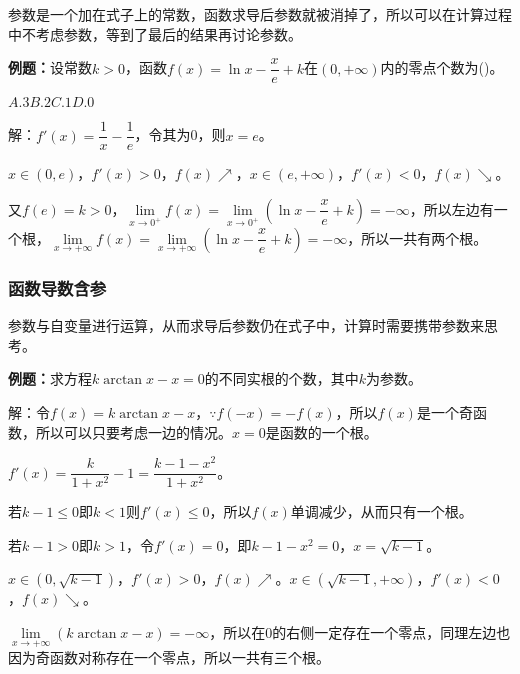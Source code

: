 \documentclass[UTF8, 12pt]{ctexart}
\begin{document}
参数是一个加在式子上的常数，函数求导后参数就被消掉了，所以可以在计算过程中不考虑参数，等到了最后的结果再讨论参数。

\textbf{例题：}设常数$k>0$，函数$f(x)=\ln x-\dfrac{x}{e}+k$在$(0,+\infty)$内的零点个数为()。

$A.3$\qquad$B.2$\qquad$C.1$\qquad$D.0$

解：$f'(x)=\dfrac{1}{x}-\dfrac{1}{e}$，令其为0，则$x=e$。

$x\in(0,e)$，$f'(x)>0$，$f(x)\nearrow$，$x\in(e,+\infty)$，$f'(x)<0$，$f(x)\searrow$。

又$f(e)=k>0$，$\lim\limits_{x\to0^+}f(x)=\lim\limits_{x\to0^+}(\ln x-\dfrac{x}{e}+k)=-\infty$，所以左边有一个根，$\lim\limits_{x\to+\infty}f(x)=\lim\limits_{x\to+\infty}(\ln x-\dfrac{x}{e}+k)=-\infty$，所以一共有两个根。

\subsubsection{函数导数含参}

参数与自变量进行运算，从而求导后参数仍在式子中，计算时需要携带参数来思考。

\textbf{例题：}求方程$k\arctan x-x=0$的不同实根的个数，其中$k$为参数。

解：令$f(x)=k\arctan x-x$$，\because f(-x)=-f(x)$，所以$f(x)$是一个奇函数，所以可以只要考虑一边的情况。$x=0$是函数的一个根。

$f'(x)=\dfrac{k}{1+x^2}-1=\dfrac{k-1-x^2}{1+x^2}$。

若$k-1\leqslant0$即$k<1$则$f'(x)\leqslant0$，所以$f(x)$单调减少，从而只有一个根。

若$k-1>0$即$k>1$，令$f'(x)=0$，即$k-1-x^2=0$，$x=\sqrt{k-1}$。

$x\in(0,\sqrt{k-1})$，$f'(x)>0$，$f(x)\nearrow$。$x\in(\sqrt{k-1},+\infty)$，$f'(x)<0$，$f(x)\searrow$。

$\lim\limits_{x\to+\infty}(k\arctan x-x)=-\infty$，所以在0的右侧一定存在一个零点，同理左边也因为奇函数对称存在一个零点，所以一共有三个根。
\end{document}
